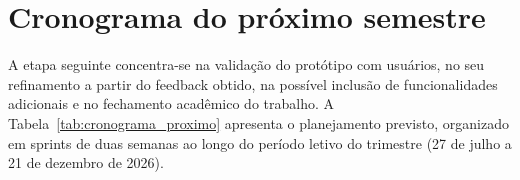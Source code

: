 \normalsize

\section{\label{sec:cronograma_proximo}Cronograma do próximo semestre}

A etapa seguinte concentra-se na validação do protótipo com usuários, no seu
refinamento a partir do feedback obtido, na possível inclusão de funcionalidades
adicionais e no fechamento acadêmico do trabalho. A Tabela~\ref{tab:cronograma_proximo}
apresenta o planejamento previsto, organizado em sprints de duas semanas ao longo do
período letivo do trimestre (27 de julho a 21 de dezembro de 2026).

\renewcommand{\arraystretch}{1.25}
\setlength{\tabcolsep}{4pt}

